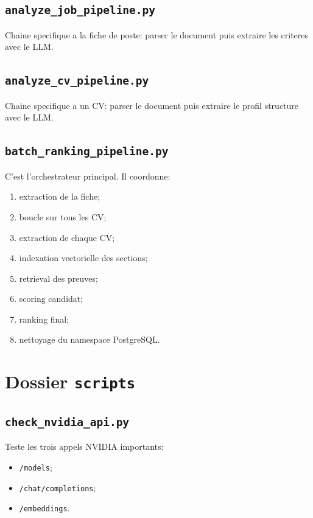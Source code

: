 \documentclass[12pt,a4paper]{article}
\begin{document}
\subsection{\texttt{analyze\_job\_pipeline.py}}

Chaine specifique a la fiche de poste: parser le document puis extraire les criteres avec le LLM.

\subsection{\texttt{analyze\_cv\_pipeline.py}}

Chaine specifique a un CV: parser le document puis extraire le profil structure avec le LLM.

\subsection{\texttt{batch\_ranking\_pipeline.py}}

C'est l'orchestrateur principal. Il coordonne:

\begin{enumerate}
  \item extraction de la fiche;
  \item boucle sur tous les CV;
  \item extraction de chaque CV;
  \item indexation vectorielle des sections;
  \item retrieval des preuves;
  \item scoring candidat;
  \item ranking final;
  \item nettoyage du namespace PostgreSQL.
\end{enumerate}

\section{Dossier \texttt{scripts}}

\subsection{\texttt{check\_nvidia\_api.py}}

Teste les trois appels NVIDIA importants:

\begin{itemize}
  \item \texttt{/models};
  \item \texttt{/chat/completions};
  \item \texttt{/embeddings}.
\end{itemize}
\end{document}
